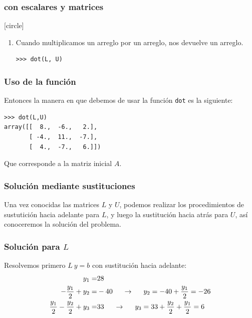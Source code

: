 \begin{frame}[fragile]
\frametitle{ con escalares y matrices}
[circle]
\begin{enumerate}[<+->]
\conti
\item Cuando multiplicamos un arreglo por un arreglo, nos devuelve un arreglo. \\
\begin{verbatim}
>>> dot(L, U)
\end{verbatim}
\end{enumerate}
\end{frame}
\begin{frame}[fragile]
\frametitle{Uso de la función }
Entonces la manera en que debemos de usar la función \texttt{dot} es la siguiente:
\begin{verbatim}
>>> dot(L,U)
array([[  8.,  -6.,   2.],
       [ -4.,  11.,  -7.],
       [  4.,  -7.,   6.]])
\end{verbatim}
Que corresponde a la matriz inicial $A$.
\end{frame}
\begin{frame}
\frametitle{Solución mediante sustituciones}
Una vez conocidas las matrices $L$ y $U$, podemos realizar los procedimientos de sustutición hacia adelante para $L$, y luego la sustitución hacia atrás para $U$, así conoceremos la solución del problema.
\end{frame}
\begin{frame}[fragile]
\frametitle{Solución para $L$}
Resolvemos primero $L \: y=b$ con sustitución hacia adelante:
\[\begin{split}
 y_{1} =& 28 \\
-\dfrac{y_{1}}{2} + y_{2} =& -40 \hspace{0.5cm} \rightarrow \hspace{0.5cm} y_{2} = -40+ \dfrac{y_{1}}{2} = -26 \\
\dfrac{y_{1}}{2} -\dfrac{y_{2}}{2} + y_{3} =& 33 \hspace{0.5cm} \rightarrow \hspace{0.5cm} y_{3} = 33 + \dfrac{y_{2}}{2}+ \dfrac{y_{1}}{2} = 6
\end{split} \]
\end{frame}

